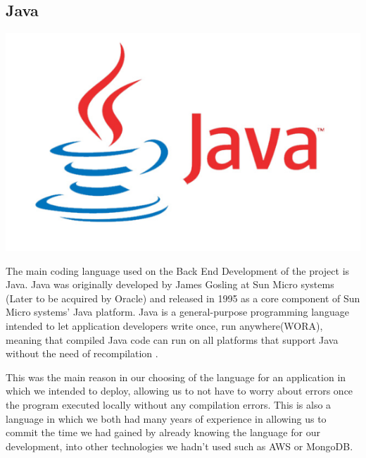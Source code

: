 \subsection{Java}
\includegraphics[scale = 0.6]{img/java-logo-1.png}\par
The main coding language used on the Back End Development of the project is Java. Java was originally developed by James Gosling at Sun Micro systems (Later to be acquired by Oracle) and released in 1995 as a core component of Sun Micro systems' Java platform. Java is a general-purpose programming language intended to let application developers write once, run anywhere(WORA), meaning that compiled Java code can run on all platforms that support Java without the need of recompilation \cite{Java}. \par
This was the main reason in our choosing of the language for an application in which we intended to deploy, allowing us to not have to worry about errors once the program executed locally without any compilation errors. This is also a language in which we both had many years of experience in allowing us to commit the time we had gained by already knowing the language for our development, into other technologies we hadn't used such as AWS or MongoDB.

